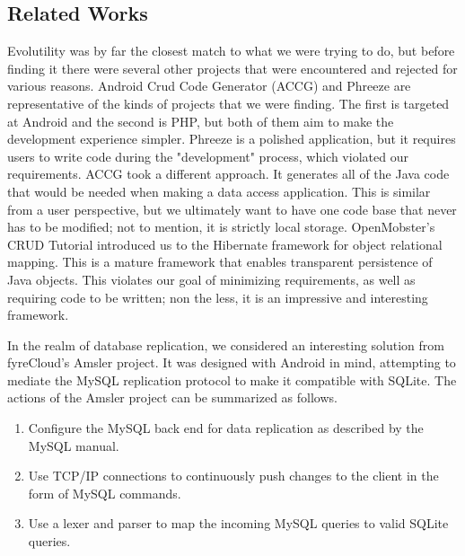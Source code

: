 \subsection{Related Works} \label{sec:related}

Evolutility\cite{giulieri_evolutility_????} was by far the closest match to what
we were trying to do, but before finding it there were several other projects
that were encountered and rejected for various reasons. Android Crud Code
Generator (ACCG)\cite{popovski_android-crud-code-generator_????} and
Phreeze\cite{hinkle_phreeze_????} are representative of the kinds of projects
that we were finding. The first is targeted at Android and the second is PHP,
but both of them aim to make the development experience simpler. Phreeze is a polished
application, but it requires users to write code during the "development"
process, which violated our requirements. ACCG took a different approach. It
generates all of the Java code that would be needed when making a data access
application. This is similar from a user perspective, but we ultimately want to
have one code base that never has to be modified; not to mention, it is strictly
local storage. OpenMobster's CRUD
Tutorial\cite{openmobster_mobilizehibernate_????} introduced us to the Hibernate
framework\cite{jboss_community_hibernate_????} for object relational mapping.
This is a mature framework that enables transparent persistence of Java objects.
This violates our goal of minimizing requirements, as well as requiring code to
be written; non the less, it is an impressive and interesting framework. 


In the realm of database replication, we considered an interesting solution from
fyreCloud's Amsler project. It was designed with Android in mind, attempting to
mediate the MySQL replication protocol to make it compatible with
SQLite\cite{fyrecloud_solutions_fyrecloud_????}. The actions of the Amsler
project can be summarized as follows.

\begin{enumerate}
\item Configure the MySQL back end for data replication as described by the MySQL manual. 
\item Use TCP/IP connections to continuously push changes to the client in the form of MySQL commands.
\item Use a lexer and parser to map the incoming MySQL queries to valid SQLite queries. 
\end{enumerate}

